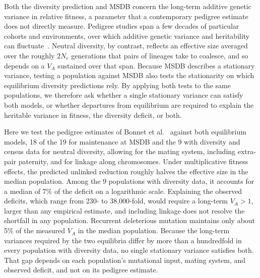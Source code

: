 \documentclass{article}
\begin{document}
Both the diversity prediction and MSDB concern the long-term additive genetic variance in relative fitness, a parameter that a contemporary pedigree estimate~\cite{bonnet2022} does not directly measure. Pedigree studies span a few decades of particular cohorts and environments, over which additive genetic variance and heritability can fluctuate~\cite{charmantier2005,wilson2006,mawass2022}. Neutral diversity, by contrast, reflects an effective size averaged over the roughly $2N_e$ generations that pairs of lineages take to coalesce, and so depends on a $V_A$ sustained over that span. Because MSDB describes a stationary variance, testing a population against MSDB also tests the stationarity on which equilibrium diversity predictions rely. By applying both tests to the same populations, we therefore ask whether a single stationary variance can satisfy both models, or whether departures from equilibrium are required to explain the heritable variance in fitness, the diversity deficit, or both.

Here we test the pedigree estimates of Bonnet et al.~\cite{bonnet2022} against both equilibrium models, 18 of the 19 for maintenance at MSDB and the 9 with diversity and census data for neutral diversity, allowing for the mating system, including extra-pair paternity, and for linkage along chromosomes. Under multiplicative fitness effects, the predicted unlinked reduction roughly halves the effective size in the median population. Among the 9 populations with diversity data, it accounts for a median of 7\% of the deficit on a logarithmic scale. Explaining the observed deficits, which range from 230- to 38,000-fold, would require a long-term $V_A > 1$, larger than any empirical estimate, and including linkage does not resolve the shortfall in any population. Recurrent deleterious mutation maintains only about 5\% of the measured $V_A$ in the median population. Because the long-term variances required by the two equilibria differ by more than a hundredfold in every population with diversity data, no single stationary variance satisfies both. That gap depends on each population's mutational input, mating system, and observed deficit, and not on its pedigree estimate.

\ifdefined\isMainDocument
\else
    \printbibliography
    
\end{document}
